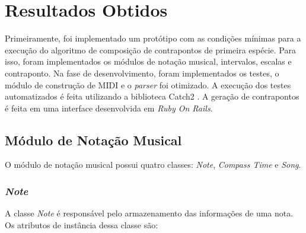 \chapter[Resultados Obtidos]{Resultados Obtidos} \label{c3}

  Primeiramente, foi implementado um protótipo com as condições mínimas para a execução do algoritmo de composição de contrapontos de primeira espécie. Para isso, foram implementados os módulos de notação musical, intervalos, escalas e contraponto. Na fase de desenvolvimento, foram implementados os testes, o módulo de construção de MIDI e o \textit{parser} foi otimizado. A execução dos testes automatizados é feita utilizando a biblioteca Catch2 \footnotemark {}. A geração de contrapontos é feita em uma interface desenvolvida em \textit{Ruby On Rails}.

  \section[Módulo de Notação Musical]{Módulo de Notação Musical}

    O módulo de notação musical possui quatro classes: \textit{Note}, \textit{Compass Time} e \textit{Song}.

    \subsection[\textit{Note}]{\textit{Note}}

      A classe \textit{Note} é responsável pelo armazenamento das informações de uma nota. Os atributos de instância dessa classe são:


